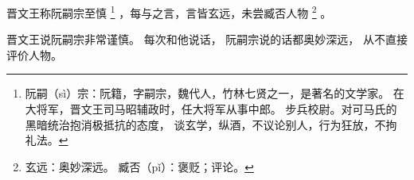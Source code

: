 
\switchcolumn*[\section{}]

晋文王称阮嗣宗至慎%
\footnote{%
    阮嗣（sì）宗：阮籍，字嗣宗，魏代人，竹林七贤之一，是著名的文学家。
                  在大将军，晋文王司马昭辅政时，任大将军从事中郎。
                  步兵校尉。对可马氏的黑暗统治抱消极抵抗的态度，
                  谈玄学，纵酒，不议论别人，行为狂放，不拘礼法。
}%
，每与之言，言皆玄远，未尝臧否人物%
\footnote{%
    玄远：奥妙深远。
    臧否（pǐ）：褒贬；评论。
}%
。

\switchcolumn

晋文王说阮嗣宗非常谨慎。
每次和他说话，
阮嗣宗说的话都奥妙深远，
从不直接评价人物。


